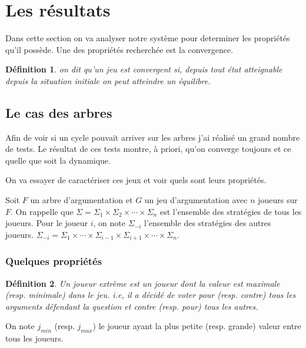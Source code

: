 \documentclass[11pt]{article}
\theoremstyle{defi}
\newtheorem{definition}{Définition}[section]
\theoremstyle{not}
\theoremstyle{prob}
\begin{document}
  \section{Les résultats}
    Dans cette section on va analyser notre système pour determiner les propriétés qu'il possède.
    Une des propriétés recherchée est la convergence.

    \begin{definition}
      on dit qu'un jeu est convergent si, depuis tout état atteignable depuis la situation initiale on peut atteindre un équilibre.
    \end{definition}

    \subsection{Le cas des arbres}
      Afin de voir si un cycle pouvait arriver sur les arbres j'ai réalisé un grand nombre de tests.
      Le résultat de ces tests montre, à priori, qu'on converge toujours et ce quelle que soit la dynamique.

      On va essayer de caractériser ces jeux et voir quels sont leurs propriétés.

      Soit $F$ un arbre d'argumentation et $G$ un jeu d'argumentation avec $n$ joueurs sur $F$.
      On rappelle que $\Sigma = \Sigma_1 \times \Sigma_2 \times \cdots \times \Sigma_n$ est l'ensemble des stratégies de tous les joueurs.
      Pour le joueur $i$, on note $\Sigma_{-i}$ l'ensemble des stratégies des autres joueurs. $\Sigma_{-i} = \Sigma_1 \times \cdots \times \Sigma_{i-1} \times \Sigma_{i+1} \times \cdots \times \Sigma_n$.

      \subsubsection{Quelques propriétés}
        \begin{definition}
          Un joueur extrème est un joueur dont la valeur est maximale (resp. minimale) dans le jeu. i.e, il a décidé de voter pour (resp. contre) tous les arguments défendant la question et contre (resp. pour) tous les autres.
        \end{definition}

        On note $j_{min}$ (resp. $j_{max}$) le joueur ayant la plus petite (resp. grande) valeur entre tous les joueurs.
\end{document}
